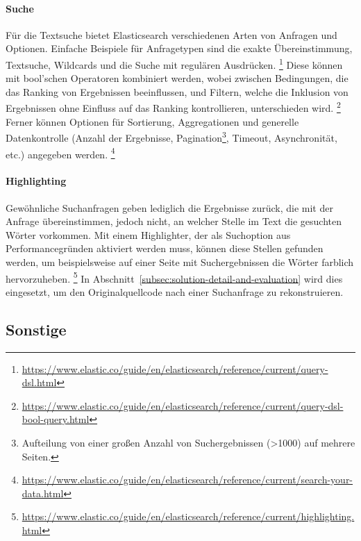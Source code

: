 \paragraph{Suche}
Für die Textsuche bietet Elasticsearch verschiedenen Arten von Anfragen und Optionen.
Einfache Beispiele für Anfragetypen sind die exakte Übereinstimmung, Textsuche, Wildcards und die Suche mit regulären Ausdrücken.
\footnote{\url{https://www.elastic.co/guide/en/elasticsearch/reference/current/query-dsl.html}}
Diese können mit bool'schen Operatoren kombiniert werden, wobei zwischen Bedingungen, die das Ranking von Ergebnissen beeinflussen, und Filtern, welche die Inklusion von Ergebnissen ohne Einfluss auf das Ranking kontrollieren, unterschieden wird.
\footnote{\url{https://www.elastic.co/guide/en/elasticsearch/reference/current/query-dsl-bool-query.html}}
Ferner können Optionen für Sortierung, Aggregationen und generelle Datenkontrolle (Anzahl der Ergebnisse, Pagination\footnote{Aufteilung von einer großen Anzahl von Suchergebnissen (>1000) auf mehrere Seiten.}, Timeout, Asynchronität, etc.) angegeben werden.
\footnote{\url{https://www.elastic.co/guide/en/elasticsearch/reference/current/search-your-data.html}}

\paragraph{Highlighting}
Gewöhnliche Suchanfragen geben lediglich die Ergebnisse zurück, die mit der Anfrage übereinstimmen, jedoch nicht, an welcher Stelle im Text die gesuchten Wörter vorkommen.
Mit einem Highlighter, der als Suchoption aus Performancegründen aktiviert werden muss, können diese Stellen gefunden werden, um beispielsweise auf einer Seite mit Suchergebnissen die Wörter farblich hervorzuheben.
\footnote{\url{https://www.elastic.co/guide/en/elasticsearch/reference/current/highlighting.html}}
In Abschnitt~\ref{subsec:solution-detail-and-evaluation} wird dies eingesetzt, um den Originalquellcode nach einer Suchanfrage zu rekonstruieren.

\subsection{Sonstige}\label{subsec:other-libraries}

